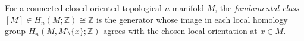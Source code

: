 
For a connected closed oriented topological $n$-manifold $M$, the \emph{fundamental class} $[M]\in H_n(M;\mathbb Z)\cong\mathbb Z$ is the generator whose image in each local homology group $H_n(M,M\setminus\{x\};\mathbb Z)$ agrees with the chosen local orientation at $x\in M$.
